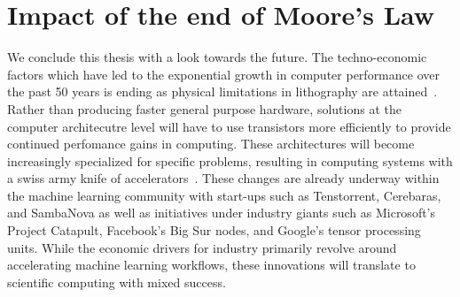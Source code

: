 \section{Impact of the end of Moore's Law}

We conclude this thesis with a look towards the future. The techno-economic factors which have led to the exponential growth in computer performance over the past 50 years is ending as physical limitations in lithography are attained~\cite{Shalf2020}. Rather than producing faster general purpose hardware, solutions at the computer architecutre level will have to use transistors more efficiently to provide continued perfomance gains in computing. These architectures will become increasingly specialized for specific problems, resulting in computing systems with a swiss army knife of accelerators~\cite{ExtremeHeterogeneity2018}. These changes are already underway within the machine learning community with start-ups such as Tenstorrent, Cerebaras, and SambaNova as well as initiatives under industry giants such as Microsoft's Project Catapult, Facebook's Big Sur nodes, and Google's tensor processing units. While the economic drivers for industry primarily revolve around accelerating machine learning workflows, these innovations will translate to scientific computing with mixed success.

